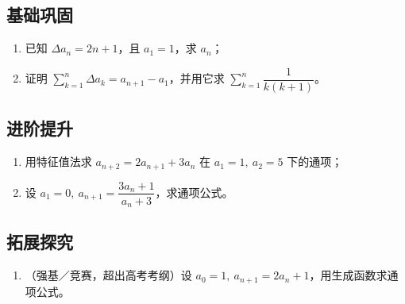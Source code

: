 \begin{afterclass}
\subsection*{基础巩固}
\begin{enumerate}
  \item 已知 $\Delta a_n=2n+1$，且 $a_1=1$，求 $a_n$；
  \item 证明 $\sum_{k=1}^n\Delta a_k=a_{n+1}-a_1$，并用它求 $\sum_{k=1}^n\dfrac1{k(k+1)}$。
\end{enumerate}

\subsection*{进阶提升}
\begin{enumerate}
  \item 用特征值法求 $a_{n+2}=2a_{n+1}+3a_n$ 在 $a_1=1,\ a_2=5$ 下的通项；
  \item 设 $a_1=0,\ a_{n+1}=\dfrac{3a_n+1}{a_n+3}$，求通项公式。
\end{enumerate}

\subsection*{拓展探究}
\begin{enumerate}
  \item （强基／竞赛，超出高考考纲）设 $a_0=1,\ a_{n+1}=2a_n+1$，用生成函数求通项公式。
\end{enumerate}


\end{afterclass}
